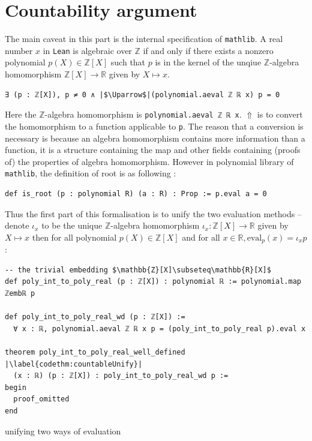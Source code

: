 \documentclass{report}
\theoremstyle{definition}
\newenvironment{code}{\captionsetup{type=listing}}{}
\begin{document}
\section{Countability argument}\label{fmlsn:count}
The main caveat in this part is the internal specification of {\tt \small mathlib}. 
A real number $x$ in {\tt \small Lean} is algebraic over $\mathbb Z$ if and only if there exists a nonzero polynomial $p(X)\in\mathbb Z[X]$ such that $p$ is in the kernel of the unqiue $\mathbb Z$-algebra homomorphism $\mathbb Z[X]\to\mathbb R$ given by $X\mapsto x$.
\begin{verbatim}
∃ (p : ℤ[X]), p ≠ 0 ∧ |$\Uparrow$|(polynomial.aeval ℤ ℝ x) p = 0
\end{verbatim}
Here the $\mathbb Z$-algebra homomorphism is {\tt \small polynomial.aeval ℤ ℝ x}. $\Uparrow$ is to convert the homomorphism to a function applicable to {\tt \small p}. The reason that a conversion is necessary is because an algebra homomorphism contains more information than a function, it is a structure containing the map and other fields containing (proofs of) the properties of algebra homomorphism.
However in polynomial library of {\tt \small mathlib}, the definition of root is as following :

\begin{verbatim}
def is_root (p : polynomial R) (a : R) : Prop := p.eval a = 0
\end{verbatim}

Thus the first part of this formalisation is to unify the two evaluation methods -- denote $\iota_x$ to be the unique $\mathbb Z$-algebra homomorphism $\iota_x : \mathbb Z[X]\to\mathbb R$ given by $X\mapsto x$ then for all polynomial $p(X)\in\mathbb Z[X]$ and for all $x\in\mathbb R,\mathrm{eval}_p(x) = \iota_x p$:

\begin{code}
\begin{verbatim}
-- the trivial embedding $\mathbb{Z}[X]\subseteq\mathbb{R}[X]$
def poly_int_to_poly_real (p : ℤ[X]) : polynomial ℝ := polynomial.map ℤembℝ p
    
def poly_int_to_poly_real_wd (p : ℤ[X]) := 
  ∀ x : ℝ, polynomial.aeval ℤ ℝ x p = (poly_int_to_poly_real p).eval x
    
theorem poly_int_to_poly_real_well_defined |\label{codethm:countableUnify}|
  (x : ℝ) (p : ℤ[X]) : poly_int_to_poly_real_wd p :=
begin
  proof_omitted
end
\end{verbatim}
\caption{unifying two ways of evaluation}
\label{code:countableUnify}
\end{code}
\end{document}
